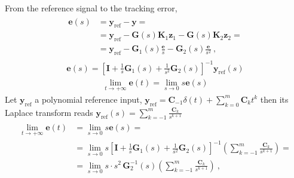 \documentclass[letterpaper,10pt,english]{jupyterBook}
\begin{document}
\sphinxAtStartPar
From the reference signal to the tracking error,
\begin{equation*}
\begin{split}\begin{aligned}
  \mathbf{e}(s)
  & = \mathbf{y}_{\text{ref}} - \mathbf{y} = \\
  & = \mathbf{y}_{\text{ref}} - \mathbf{G}(s) \mathbf{K}_1 \mathbf{z}_1 - \mathbf{G}(s) \mathbf{K}_2 \mathbf{z}_2 = \\
  & = \mathbf{y}_{\text{ref}} - \mathbf{G}_1(s) \frac{\mathbf{e}}{s} - \mathbf{G}_2(s) \frac{\mathbf{e}}{s^2} \ ,
\end{aligned}\end{split}
\end{equation*}\begin{equation*}
\begin{split}\mathbf{e}(s) = \left[ \mathbf{I} + \frac{1}{s} \mathbf{G}_1(s) + \frac{1}{s^2} \mathbf{G}_2(s) \right]^{-1} \mathbf{y}_{\text{ref}}(s)\end{split}
\end{equation*}
\sphinxAtStartPar
{}
\begin{equation*}
\begin{split}\lim_{t \rightarrow +\infty} \mathbf{e}(t) = \lim_{s \rightarrow 0} s \mathbf{e}(s)\end{split}
\end{equation*}
\sphinxAtStartPar
Let \(\mathbf{y}_{\text{ref}}\) a polynomial reference input, \(\mathbf{y}_{\text{ref}} = \mathbf{C}_{-1} \delta(t) + \sum_{k=0}^{m} \mathbf{C}_k t^k\) then its Laplace transform reads \(\mathbf{y}_{\text{ref}}(s) = \sum_{k=-1}^{m} \frac{\mathbf{C}_k}{s^{k+1}}\)
\begin{equation*}
\begin{split}\begin{aligned}
  \lim_{t \rightarrow +\infty} \mathbf{e}(t) 
  & = \lim_{s \rightarrow 0} s \mathbf{e}(s) = \\
  & = \lim_{s \rightarrow 0} s \left[ \mathbf{I} + \frac{1}{s} \mathbf{G}_1(s) + \frac{1}{s^2} \mathbf{G}_2(s) \right]^{-1} \left( \sum_{k=-1}^{m} \frac{\mathbf{C}_k}{s^{k+1}} \right) = \\
  & = \lim_{s \rightarrow 0} s \cdot s^2 \, \mathbf{G}_2^{-1}(s) \left( \sum_{k=-1}^{m} \frac{\mathbf{C}_k}{s^{k+1}} \right) \ ,
\end{aligned}\end{split}
\end{equation*}
\sphinxAtStartPar
\end{document}
